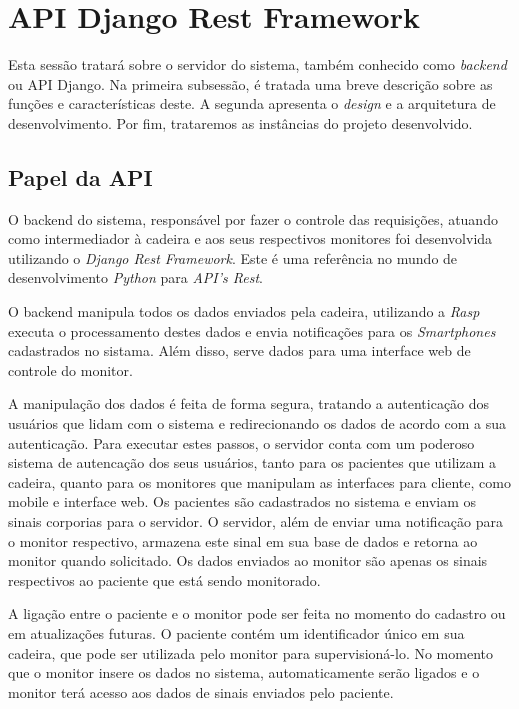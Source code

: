 \section{API Django Rest Framework}
Esta sessão tratará sobre o servidor do sistema, também conhecido como \textit{backend}
ou API Django. Na primeira subsessão, é tratada uma breve descrição sobre as funções
e características deste. A segunda apresenta o \textit{design} e a arquitetura
de desenvolvimento. Por fim, trataremos as instâncias do projeto desenvolvido.


\subsection{Papel da API}
\label{sub:papel_da_api}
O backend do sistema, responsável por fazer o controle das requisições,
atuando como intermediador à cadeira e aos seus respectivos monitores   
foi desenvolvida utilizando o \textit{Django Rest Framework}. Este é uma
referência no mundo de desenvolvimento \textit{Python} para \textit{API's Rest}.

O backend manipula todos os dados enviados pela cadeira, utilizando a \textit{Rasp}
executa o processamento destes dados e envia notificações para os \textit{Smartphones}
cadastrados no sistama. Além disso, serve dados para uma interface web de controle
do monitor.

A manipulação dos dados é feita de forma segura, tratando a autenticação dos usuários
que lidam com o sistema e redirecionando os dados de acordo com a sua autenticação.
Para executar estes passos, o servidor conta com um poderoso sistema de autencação
dos seus usuários, tanto para os pacientes que utilizam a cadeira, quanto para os
monitores que manipulam as interfaces para cliente, como mobile e interface web.
Os pacientes são cadastrados no sistema e enviam os sinais corporias para o servidor.
O servidor, além de enviar uma notificação para o monitor respectivo, armazena este
sinal em sua base de dados e retorna ao monitor quando solicitado.
Os dados enviados ao monitor são apenas os sinais respectivos ao paciente que está
sendo monitorado.

A ligação entre o paciente e o monitor pode ser feita no momento do cadastro ou em
atualizações futuras. O paciente contém um identificador único em sua cadeira, que
pode ser utilizada pelo monitor para supervisioná-lo. No momento que o monitor insere
os dados no sistema, automaticamente serão ligados e o monitor terá acesso aos dados
de sinais enviados pelo paciente.

